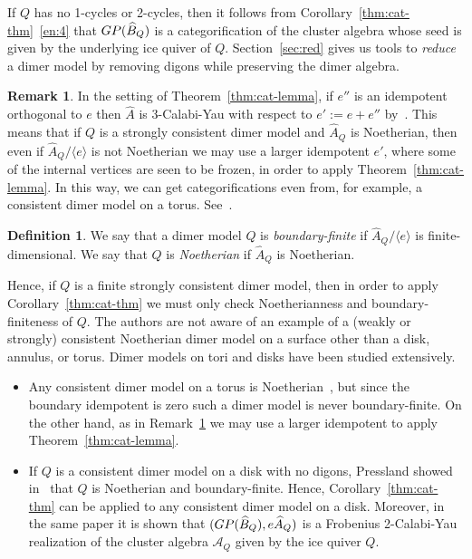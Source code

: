 \documentclass{article}
\theoremstyle{definition}
\newtheorem{defn}[thm]{Definition}
\newtheorem{remk}[thm]{Remark}
\renewcommand{\AA}{\mathscr A}
\begin{document}
	If $Q$ has no 1-cycles or 2-cycles, then 
it follows from Corollary~\ref{thm:cat-thm}~\eqref{en:4}
that ${\textup{GP}}(\widehat B_Q)$ is a categorification of the cluster algebra whose seed is given by the underlying ice quiver of $Q$.
	Section~\ref{sec:red} gives us tools to \textit{reduce} a dimer model by removing digons while preserving the dimer algebra.

\begin{remk}\label{remk:gggg}
	In the setting of Theorem~\ref{thm:cat-lemma}, if $e''$ is an idempotent orthogonal to $e$ then $\widehat A$ is 3-Calabi-Yau with respect to $e':=e+e''$ by~\cite[Remark 2.2]{XPressland2015}. This means that if $Q$ is a strongly consistent dimer model and $\widehat A_Q$ is Noetherian, then even if $\widehat A_Q/\langle e\rangle$ is not Noetherian we may use a larger idempotent $e'$, where some of the internal vertices are seen to be frozen, in order to apply Theorem~\ref{thm:cat-lemma}. In this way, we can get categorifications even from, for example, a consistent dimer model on a torus. See~\cite[\S6]{AIRX}.
\end{remk}

\begin{defn}\label{defn:bf}
	We say that a dimer model $Q$ is \textit{boundary-finite} if $\widehat A_Q/\langle e\rangle$ is finite-dimensional. We say that $Q$ is \textit{Noetherian} if $\widehat A_Q$ is Noetherian.
\end{defn}

Hence, if $Q$ is a finite strongly consistent dimer model, then in order to apply Corollary~\ref{thm:cat-thm} we must only check Noetherianness and boundary-finiteness of $Q$.
The authors are not aware of an example of a (weakly or strongly) consistent Noetherian dimer model on a surface other than a disk, annulus, or torus.
Dimer models on tori and disks have been studied extensively. 
\begin{itemize}
	\item Any consistent dimer model on a torus is Noetherian~\cite{Beil2021}, but since the boundary idempotent is zero such a dimer model is never boundary-finite. On the other hand, as in Remark~\ref{remk:gggg} we may use a larger idempotent to apply Theorem~\ref{thm:cat-lemma}.
	\item If $Q$ is a consistent dimer model on a disk with no digons, Pressland showed in~\cite[Proposition 4.4]{XPressland2019} that $Q$ is Noetherian and boundary-finite. Hence, Corollary~\ref{thm:cat-thm} can be applied to any consistent dimer model on a disk.
Moreover, in the same paper it is shown that $(\textup{GP}(\widehat B_Q),e\widehat A_Q)$ is a Frobenius 2-Calabi-Yau realization of the cluster algebra $\AA_Q$ given by the ice quiver $Q$.
\end{itemize}
\end{document}

